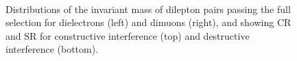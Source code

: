 \begin{figure}[!htpb]
\centering
{} %
\\ %
\caption{
Distributions of the invariant mass of dilepton pairs passing the full selection for dielectrons (left) and dimuons (right), and showing CR and SR for constructive interference (top) and destructive interference (bottom).
}
\end{figure}
